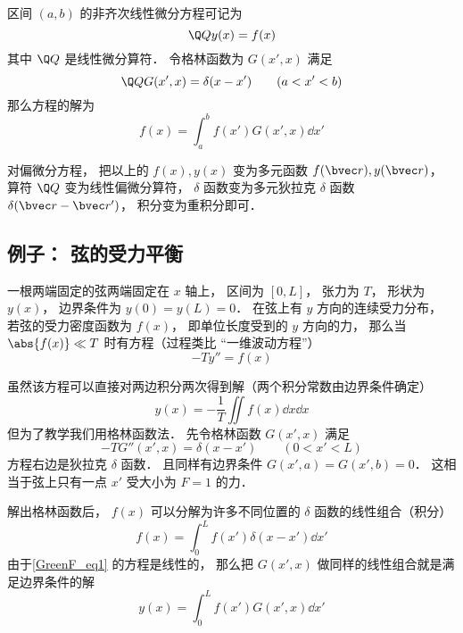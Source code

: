
\begin{issues}
\issueDraft
\end{issues}


区间 $(a,b)$ 的非齐次线性微分方程可记为
\begin{equation}
\Q Q y(x) = f(x)
\end{equation}
其中 $\Q Q$ 是线性微分算符． 令格林函数为 $G(x', x)$ 满足
\begin{equation}
\Q Q G(x', x) = \delta(x - x') \qquad (a < x' < b)
\end{equation}
那么方程的解为
\begin{equation}
f(x) = \int_a^b f(x') G(x', x) \dd{x'}
\end{equation}

对偏微分方程， 把以上的 $f(x), y(x)$ 变为多元函数 $f(\bvec r), y(\bvec r)$， 算符 $\Q Q$ 变为线性偏微分算符， $\delta$ 函数变为多元狄拉克 $\delta$ 函数 $\delta(\bvec r - \bvec r')$， 积分变为重积分即可．

\subsection{例子： 弦的受力平衡}
一根两端固定的弦两端固定在 $x$ 轴上， 区间为 $[0, L]$， 张力为 $T$， 形状为 $y(x)$， 边界条件为 $y(0) = y(L) = 0$． 在弦上有 $y$ 方向的连续受力分布， 若弦的受力密度函数为 $f(x)$， 即单位长度受到的 $y$ 方向的力， 那么当 $\abs{f(x)} \ll T$ 时有方程（过程类比 “一维波动方程”）
\begin{equation}\label{GreenF_eq1}
-T y'' = f(x)
\end{equation}

虽然该方程可以直接对两边积分两次得到解（两个积分常数由边界条件确定）
\begin{equation}
y(x) = -\frac{1}{T}\iint f(x) \dd{x}\dd{x}
\end{equation}
但为了教学我们用格林函数法． 先令格林函数 $G(x', x)$ 满足
\begin{equation}\label{GreenF_eq2}
-T G''(x', x) = \delta(x - x') \qquad (0 < x' < L)
\end{equation}
方程右边是狄拉克 $\delta$ 函数． 且同样有边界条件 $G(x', a) = G(x', b) = 0$． 这相当于弦上只有一点 $x'$ 受大小为 $F = 1$ 的力．

解出格林函数后， $f(x)$ 可以分解为许多不同位置的 $\delta$ 函数的线性组合（积分）
\begin{equation}
f(x) = \int_0^L f(x') \delta(x - x') \dd{x'}
\end{equation}
由于\autoref{GreenF_eq1} 的方程是线性的， 那么把 $G(x', x)$ 做同样的线性组合就是满足边界条件的解
\begin{equation}\label{GreenF_eq3}
y(x) = \int_0^L f(x') G(x', x) \dd{x'}
\end{equation}

